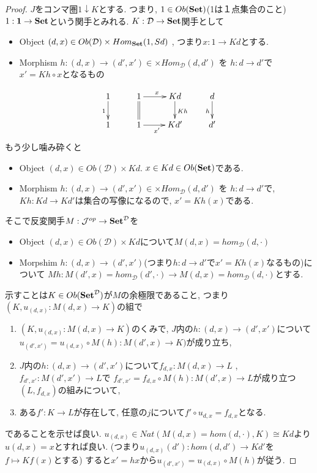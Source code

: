 \documentclass[dvipdfmx,a4paper,11pt]{article}
\theoremstyle{definition}
\begin{document}
\begin{proof}
$J$をコンマ圏$1 \downarrow K$とする.
つまり,
$1 \in Ob({\bf Set})$(1は１点集合のこと)
$1 :  {\bf 1} \to {\bf Set}$という関手とみれる. 
$K : \mathcal{D} \to {\bf Set}$関手として
\begin{itemize}
\item Object $(d,x) \in Ob(\mathcal{D}) \times Hom_{{\bf Set}}(1, Sd)$ , つまり$x : 1 \to Kd$とする. 
\item Morphism $h : (d,x)  \to (d',x') \in \times Hom_{\mathcal{D}}(d,d') $ を 
$h: d \to d'$で$x'  = Kh \circ x$となるもの
\end{itemize}

\begin{equation*}
\xymatrix@C=25pt@R=20pt{
1 \ar@{->}[d] _{1}&1\ar@{=}[d] \ar@{->}[r]^{x} & Kd\ar@{->}[d]^{Kh} &d\ar@{->}[d]_{h}\\
1&1\ar@{->}[r]_{x'} &Kd'&d' \\   
}
\end{equation*}
もう少し噛み砕くと
\begin{itemize}
\item Object $(d,x) \in Ob(\mathcal{D}) \times Kd$. $x \in Kd \in Ob({\bf Set})$である.
\item Morphism $h : (d,x)  \to (d',x') \in \times Hom_{\mathcal{D}}(d,d')$ を
$h: d \to d'$で, $Kh : Kd \to Kd'$は集合の写像になるので, $x' = Kh(x)$である. 
\end{itemize}

そこで反変関手$M : \mathcal{J}^{op} \to {\bf Set }^{\mathcal{D}}$を
\begin{itemize}
\item Object $(d,x) \in Ob(\mathcal{D}) \times Kd$について$M(d,x) = hom_{\mathcal{D}}(d, \cdot)$
\item Morpshim $h : (d,x)  \to (d',x') $(つまり$h : d \to d'$で$x' = Kh(x)$なるもの)について
$Mh :  M(d',x) = hom_{\mathcal{D}}(d', \cdot) \to  M(d,x) = hom_{\mathcal{D}}(d, \cdot) $とする.
\end{itemize}

示すことは$K \in Ob({\bf Set}^{\mathcal{D}})$が$M$の余極限であること, 
つまり
$(K, u_{(d,x)}: M(d,x) \to K)$の組で
\begin{enumerate}
\item $(K, u_{(d,x)}: M(d,x) \to K)$のくみで, $J$内の$h : (d,x)\to (d',x')$について$u_{(d',x')}  = u_{(d,x)} \circ M(h) : M(d',x) \to K)$が成り立ち, 
\item $J$内の$h : (d,x)\to (d',x')$について$f_{d,x} : M(d,x) \to L$
, $f_{d',x'} : M(d',x') \to L$で
$f_{d',x'}  = f_{d,x}\circ M(h) : M(d',x) \to L$が成り立つ$(L, f_{d,x})$の組みについて,
\item ある$f' : K \to L$が存在して, 任意の$j$について$f' \circ u_{d,x} = f_{d,x}$となる.
\end{enumerate}
であることを示せば良い.
$u_{(d,x)} \in  Nat(M(d,x)=hom(d, \cdot) ,  K ) \cong Kd$より$u{(d,x)} = x$とすれば良い. 
(つまり$u_{(d,x)}(d') : hom(d, d') \to  Kd'$を$f \mapsto Kf(x)$とする)
すると$x' =hx$から$u_{(d',x')}  = u_{(d,x)} \circ M(h)$が従う.


\end{proof}
\end{document}
